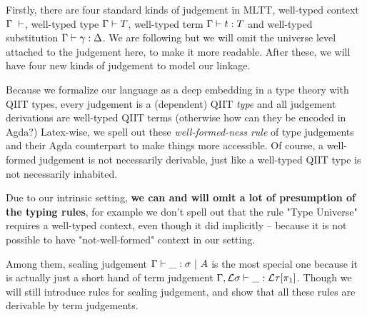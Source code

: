 Firstly, there are four standard kinds of judgement in MLTT, well-typed context $\goodCtx{\Gamma}{l}$, well-typed type $\goodType{\Gamma}{T}{l}$, well-typed term $\goodTerm{\Gamma}{t}{T}$ and well-typed substitution $\goodSub{\Gamma}{\gamma}{\Delta}$. We are following \citep{kaposi2019gluing} but we will omit the universe level attached to the judgement here, to make it more readable. After these, we will have four new kinds of judgement to model our linkage. 

Because we formalize our language as a deep embedding in a type theory with QIIT types, every judgement is a (dependent) QIIT \textit{type} and all judgement derivations are well-typed QIIT terms (otherwise how can they be encoded in Agda?)
Latex-wise, we spell out these \textit{well-formed-ness rule} of type judgements and their Agda counterpart to make things more accessible. Of course, a well-formed judgement is not necessarily derivable, just like a well-typed QIIT type is not necessarily inhabited. 

Due to our intrinsic setting, \textbf{we can and will omit a lot of presumption of the typing rules}, for example we don't spell out that the rule "Type Universe" requires a well-typed context, even though it did implicitly -- because it is not possible to have "not-well-formed" context in our setting.

Among them, sealing judgement $\goodSeal{\Gamma}{\_}{\sigma}{A}$ is the most special one because it is actually just a short hand of term judgement $\goodTerm{\Gamma , \cL \sigma}{\_}{\cL\tau[\pi_1]}$.  Though we will still introduce rules for sealing judgement, and show that all these rules are derivable by term judgements.

